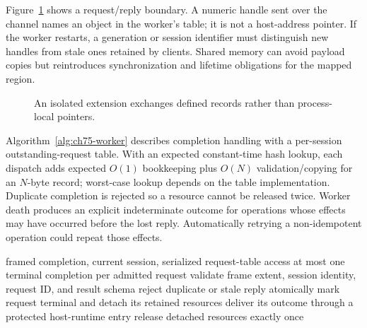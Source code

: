 Figure~\ref{fig:ch75-worker} shows a request/reply boundary.
A numeric handle sent over the channel names an object in the worker's table; it is not a host-address pointer.
If the worker restarts, a generation or session identifier must distinguish new handles from stale ones retained by clients.
Shared memory can avoid payload copies but reintroduces synchronization and lifetime obligations for the mapped region.

\begin{figure}[htbp]
\centering
{}
\caption{An isolated extension exchanges defined records rather than process-local pointers.}
\label{fig:ch75-worker}
\end{figure}

Algorithm~\ref{alg:ch75-worker} describes completion handling with a per-session outstanding-request table.
With an expected constant-time hash lookup, each dispatch adds expected $O(1)$ bookkeeping plus $O(N)$ validation/copying for an $N$-byte record; worst-case lookup depends on the table implementation.
Duplicate completion is rejected so a resource cannot be released twice.
Worker death produces an explicit indeterminate outcome for operations whose effects may have occurred before the lost reply.
Automatically retrying a non-idempotent operation could repeat those effects.

\begin{algorithm}[htbp]
\caption{Accept a worker completion only for one live request in the current session.}
\label{alg:ch75-worker}
\begin{pseudocode}
\Require framed completion, current session, serialized request-table access
\Ensure at most one terminal completion per admitted request
\State validate frame extent, session identity, request ID, and result schema
 \State reject duplicate or stale reply \EndIf
\State atomically mark request terminal and detach its retained resources
\State deliver its outcome through a protected host-runtime entry
\State release detached resources exactly once
\end{pseudocode}
\end{algorithm}

